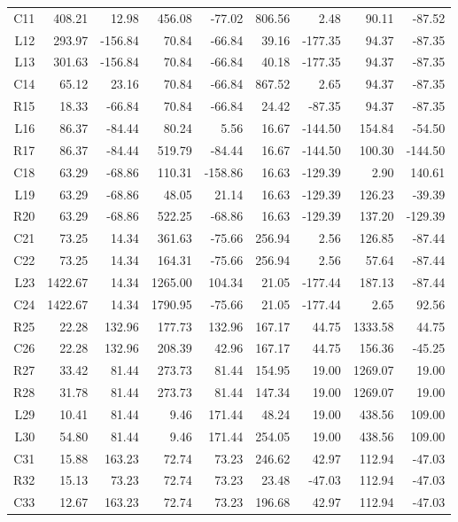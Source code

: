\begin{longtable}{rrrrrrrrr}
C11 & 408.21 & 12.98 & 456.08 & -77.02 & 806.56 & 2.48 & 90.11 & -87.52\\
L12 & 293.97 & -156.84 & 70.84 & -66.84 & 39.16 & -177.35 & 94.37 & -87.35\\
L13 & 301.63 & -156.84 & 70.84 & -66.84 & 40.18 & -177.35 & 94.37 & -87.35\\
C14 & 65.12 & 23.16 & 70.84 & -66.84 & 867.52 & 2.65 & 94.37 & -87.35\\
R15 & 18.33 & -66.84 & 70.84 & -66.84 & 24.42 & -87.35 & 94.37 & -87.35\\
L16 & 86.37 & -84.44 & 80.24 & 5.56 & 16.67 & -144.50 & 154.84 & -54.50\\
R17 & 86.37 & -84.44 & 519.79 & -84.44 & 16.67 & -144.50 & 100.30 & -144.50\\
C18 & 63.29 & -68.86 & 110.31 & -158.86 & 16.63 & -129.39 & 2.90 & 140.61\\
L19 & 63.29 & -68.86 & 48.05 & 21.14 & 16.63 & -129.39 & 126.23 & -39.39\\
R20 & 63.29 & -68.86 & 522.25 & -68.86 & 16.63 & -129.39 & 137.20 & -129.39\\
C21 & 73.25 & 14.34 & 361.63 & -75.66 & 256.94 & 2.56 & 126.85 & -87.44\\
C22 & 73.25 & 14.34 & 164.31 & -75.66 & 256.94 & 2.56 & 57.64 & -87.44\\
L23 & 1422.67 & 14.34 & 1265.00 & 104.34 & 21.05 & -177.44 & 187.13 & -87.44\\
C24 & 1422.67 & 14.34 & 1790.95 & -75.66 & 21.05 & -177.44 & 2.65 & 92.56\\
R25 & 22.28 & 132.96 & 177.73 & 132.96 & 167.17 & 44.75 & 1333.58 & 44.75\\
C26 & 22.28 & 132.96 & 208.39 & 42.96 & 167.17 & 44.75 & 156.36 & -45.25\\
R27 & 33.42 & 81.44 & 273.73 & 81.44 & 154.95 & 19.00 & 1269.07 & 19.00\\
R28 & 31.78 & 81.44 & 273.73 & 81.44 & 147.34 & 19.00 & 1269.07 & 19.00\\
L29 & 10.41 & 81.44 & 9.46 & 171.44 & 48.24 & 19.00 & 438.56 & 109.00\\
L30 & 54.80 & 81.44 & 9.46 & 171.44 & 254.05 & 19.00 & 438.56 & 109.00\\
C31 & 15.88 & 163.23 & 72.74 & 73.23 & 246.62 & 42.97 & 112.94 & -47.03\\
R32 & 15.13 & 73.23 & 72.74 & 73.23 & 23.48 & -47.03 & 112.94 & -47.03\\
C33 & 12.67 & 163.23 & 72.74 & 73.23 & 196.68 & 42.97 & 112.94 & -47.03\\

\end{longtable}

